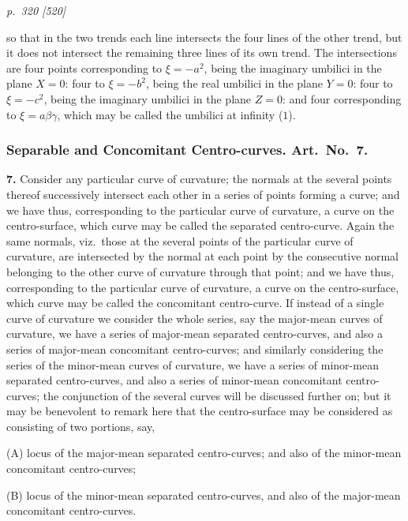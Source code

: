 \documentclass[11pt,a4paper]{article}
\theoremstyle{plain}
\theoremstyle{definition}
\begin{document}
\clearpage

\bigskip
\textit{p.~320 [520]}
\smallskip

so that in the two trends each line intersects the four lines of the other trend, but it does not intersect the remaining three lines of its own trend. The intersections are four points corresponding to $\xi = -a^2$, being the imaginary umbilici in the plane $X = 0$: four to $\xi = -b^2$, being the real umbilici in the plane $Y = 0$: four to $\xi = -c^2$, being the imaginary umbilici in the plane $Z = 0$: and four corresponding to $\xi = a\beta\gamma$, which may be called the umbilici at infinity ($1$).

\subsubsection*{Separable and Concomitant Centro-curves. Art.\ No.\ 7.}

\textbf{7.} Consider any particular curve of curvature; the normals at the several points thereof successively intersect each other in a series of points forming a curve; and we have thus, corresponding to the particular curve of curvature, a curve on the centro-surface, which curve may be called the separated centro-curve. Again the same normals, viz.\ those at the several points of the particular curve of curvature, are intersected by the normal at each point by the consecutive normal belonging to the other curve of curvature through that point; and we have thus, corresponding to the particular curve of curvature, a curve on the centro-surface, which curve may be called the concomitant centro-curve. If instead of a single curve of curvature we consider the whole series, say the major-mean curves of curvature, we have a series of major-mean separated centro-curves, and also a series of major-mean concomitant centro-curves; and similarly considering the series of the minor-mean curves of curvature, we have a series of minor-mean separated centro-curves, and also a series of minor-mean concomitant centro-curves; the conjunction of the several curves will be discussed further on; but it may be benevolent to remark here that the centro-surface may be considered as consisting of two portions, say,

(A) locus of the major-mean separated centro-curves; and also of the minor-mean concomitant centro-curves;

(B) locus of the minor-mean separated centro-curves, and also of the major-mean concomitant centro-curves.
\end{document}
